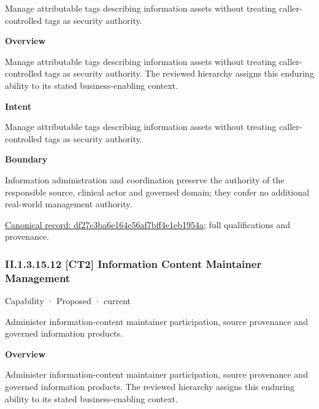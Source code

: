Manage attributable tags describing information assets without treating caller-controlled tags as security authority.



\textbf{Overview}



Manage attributable tags describing information assets without treating caller-controlled tags as security authority. The reviewed hierarchy assigns this enduring ability to its stated business-enabling context.



\textbf{Intent}



Manage attributable tags describing information assets without treating caller-controlled tags as security authority.



\textbf{Boundary}



Information administration and coordination preserve the authority of the responsible source, clinical actor and governed domain; they confer no additional real-world management authority.


{\footnotesize \href{../../../../continuum/strategy/capability/df27c3ba6e164e56af7bff4e1eb1954a.md}{Canonical record: df27c3ba6e164e56af7bff4e1eb1954a}; full qualifications and provenance.}\par
\subsubsection*{II.1.3.15.12 [CT2] Information Content Maintainer Management}
\label{navigation:II.1.3.15.12}

\label{element:b81a1ab42af24c2e9896b8f3f78d291a}
{\small Capability · Proposed · current}\par

Administer information-content maintainer participation, source provenance and governed information products.



\textbf{Overview}



Administer information-content maintainer participation, source provenance and governed information products. The reviewed hierarchy assigns this enduring ability to its stated business-enabling context.



